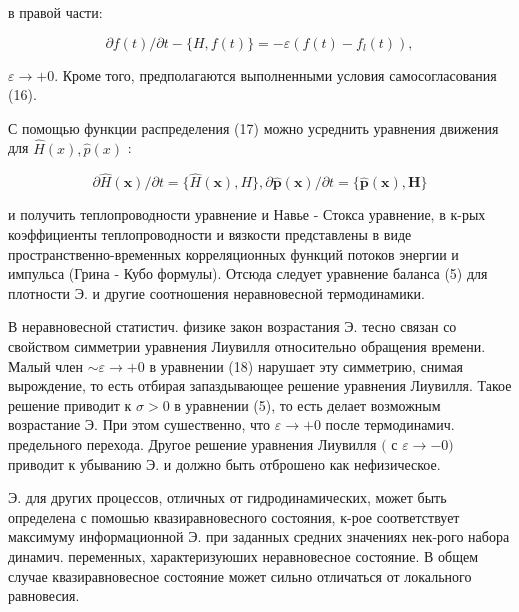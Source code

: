 \documentclass[10pt]{article}
\begin{document}
в правой части:



\[

\partial f(t) / \partial t-\{H, f(t)\}=-\varepsilon\left(f(t)-f_{l}(t)\right),

\]



$\varepsilon \rightarrow+0$. Кроме того, предполагаются выполненными условия самосогласования (16).



С помощью функции распределения (17) можно усреднить уравнения движения для $\hat{H}(x), \hat{p}(x)$ :



\[

\partial \hat{H}(\boldsymbol{x}) / \partial t=\{\hat{H}(\boldsymbol{x}), H\}, \partial \hat{\boldsymbol{p}}(\boldsymbol{x}) / \partial t=\{\hat{\boldsymbol{p}}(\boldsymbol{x}), \boldsymbol{H}\}

\]



и получить теплопроводности уравнение и Навье - Стокса уравнение, в к-рых коэффициенты теплопроводности и вязкости представлены в виде пространственно-временных корреляционных функций потоков энергии и импульса (Грина - Кубо формулы). Отсюда следует уравнение баланса (5) для плотности Э. и другие соотношения неравновесной термодинамики.



В неравновесной статистич. физике закон возрастания $Э$. тесно связан со свойством симметрии уравнения Лиувилля относительно обращения времени. Малый член $\sim \varepsilon \rightarrow+0$ в уравнении (18) нарушает эту симметрию, снимая вырождение, то есть отбирая запаздывающее решение уравнения Лиувилля. Такое решение приводит к $\sigma>0$ в уравнении (5), то есть делает возможным возрастание Э. При этом сушественно, что $\varepsilon \rightarrow+0$ после термодинамич. предельного перехода. Другое решение уравнения Лиувилля $($ с $\varepsilon \rightarrow-0)$ приводит к убыванию Э. и должно быть отброшено как нефизическое.



Э. для других процессов, отличных от гидродинамических, может быть определена с помошью квазиравновесного состояния, к-рое соответствует максимуму информационной Э. при заданных средних значениях нек-рого набора динамич. переменных, характеризуюших неравновесное состояние. В общем случае квазиравновесное состояние может сильно отличаться от локального равновесия.
\end{document}
